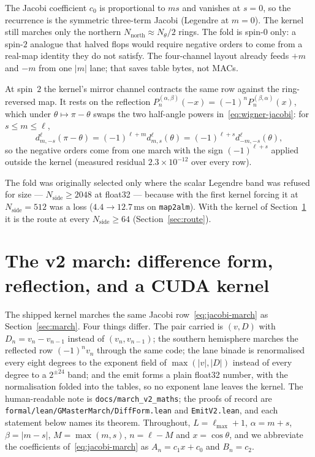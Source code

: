 \documentclass[usenatbib,useAMS]{mnras}
\begin{document}
The Jacobi coefficient $c_0$ is proportional to $m s$ and vanishes at $s=0$, so the recurrence is the symmetric three-term Jacobi (Legendre at $m=0$). The kernel still marches only the northern $N_{\mathrm{north}}\approx N_\theta/2$ rings. The fold is spin-$0$ only: a spin-$2$ analogue that halved flops would require negative orders to come from a real-map identity they do not satisfy. The four-channel layout already feeds $+m$ and $-m$ from one $|m|$ lane; that saves table bytes, not MACs.

At spin~$2$ the kernel's mirror channel contracts the same row against the ring-reversed map. It rests on the reflection $P_n^{(\alpha,\beta)}(-x)=(-1)^nP_n^{(\beta,\alpha)}(x)$, which under $\theta\mapsto\pi-\theta$ swaps the two half-angle powers in~\eqref{eq:wigner-jacobi}: for $s\le m\le\ell$,
\begin{equation}
\label{eq:mirror}
d^\ell_{m,-s}(\pi-\theta)=(-1)^{\ell+m}d^\ell_{m,s}(\theta)=(-1)^{\ell+s}d^\ell_{-m,-s}(\theta),
\end{equation}
so the negative orders come from one march with the sign $(-1)^{\ell+s}$ applied outside the kernel (measured residual $2.3\times10^{-12}$ over every row).

The fold was originally selected only where the scalar Legendre band was refused for size --- $N_{\mathrm{side}}\ge2048$ at float32 --- because with the first kernel forcing it at $N_{\mathrm{side}}=512$ was a loss ($4.4\to12.7\,\mathrm{ms}$ on \texttt{map2alm}). With the kernel of Section~\ref{sec:v2} it is the route at every $N_{\mathrm{side}}\ge64$ (Section~\ref{sec:route}).

\section{The v2 march: difference form, reflection, and a CUDA kernel}
\label{sec:v2}

The shipped kernel marches the same Jacobi row~\eqref{eq:jacobi-march} as Section~\ref{sec:march}. Four things differ. The pair carried is $(v,D)$ with $D_n=v_n-v_{n-1}$ instead of $(v_n,v_{n-1})$; the southern hemisphere marches the reflected row $(-1)^nv_n$ through the same code; the lane binade is renormalised every eight degrees to the exponent field of $\max(\lvert v\rvert,\lvert D\rvert)$ instead of every degree to a $2^{\pm24}$ band; and the emit forms a plain float32 number, with the normalisation folded into the tables, so no exponent lane leaves the kernel. The human-readable note is \texttt{docs/march\_v2\_maths}; the proofs of record are \texttt{formal/lean/GMasterMarch/DiffForm.lean} and \texttt{EmitV2.lean}, and each statement below names its theorem. Throughout, $L=\ell_{\max}+1$, $\alpha=m+s$, $\beta=\lvert m-s\rvert$, $M=\max(m,s)$, $n=\ell-M$ and $x=\cos\theta$, and we abbreviate the coefficients of~\eqref{eq:jacobi-march} as $A_n=c_1x+c_0$ and $B_n=c_2$.
\end{document}
